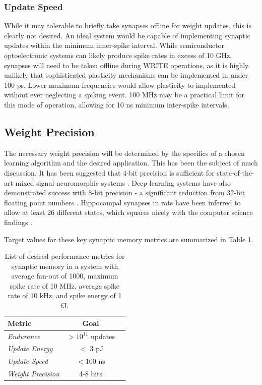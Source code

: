 \documentclass[twocolumn]{article}
\begin{document}
\subsubsection{Update Speed}
While it may tolerable to briefly take synapses offline for weight updates, this is clearly not desired. An ideal system would be capable of implementing synaptic updates within the minimum inner-spike interval. While semiconductor optoelectronic systems can likely produce spike rates in excess of 10 GHz, synapses will need to be taken offline during WRITE operations, as it is highly unlikely that sophisticated plasticity mechanisms can be implemented in under 100 ps. Lower maximum frequencies would allow plasticity to implemented without ever neglecting a spiking event. 100 MHz may be a practical limit for this mode of operation, allowing for 10 ns minimum inter-spike intervals.

\subsection{Weight Precision}
The necessary weight precision will be determined by the specifics of a chosen learning algorithm and the desired application. This has been the subject of much discussion. It has been suggested that 4-bit precision is sufficient for state-of-the-art mixed signal neuromorphic systems \cite{pfeil20124}. Deep learning systems have also demonstrated success with 8-bit precision - a significant reduction from 32-bit floating point numbers \cite{wang2018training}. Hippocampal synapses in rats have been inferred to allow at least 26 different states, which squares nicely with the computer science findings \cite{bartol2015nanoconnectomic}. 

Target values for these key synaptic memory metrics are summarized in Table \ref{tab:memory_metrics}.

\begin{table}[h!]
  \begin{center}
    \label{tab:memory_metrics}
    \begin{tabular}{l|c|r} %
      \textbf{Metric} & \textbf{Goal} \\
      \hline
      \textit{Endurance} & $>10^{11}$ updates \\
      \textit{Update Energy} & $<$ 3 pJ\\
      \textit{Update Speed} & $<100$ ns \\
      \textit{Weight Precision} & 4-8 bits
      
    \end{tabular}
    \caption{List of desired performance metrics for synaptic memory in a system with average fan-out of 1000, maximum spike rate of 10 MHz, average spike rate of 10 kHz, and spike energy of 1 fJ.}
  \end{center}
\end{table}
\end{document}
